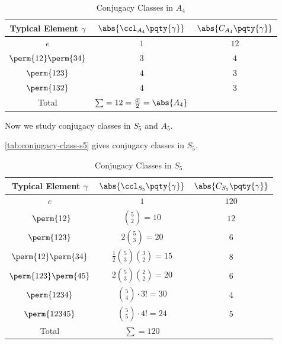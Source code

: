 \begin{table}[ht!]
    \centering
    \begin{tabular}{ccc}
        Typical Element \(\gamma\) & \(\abs{\ccl_{A_4} \pqty{\gamma}}\) & \(\abs{C_{A_4} \pqty{\gamma}}\)\\
        \hline\hline
        \(e\) & \(1\) & \(12\) \\
        \(\perm{12} \perm{34}\) & \(3\) & \(4\) \\
        \(\perm{123}\) & \(4\) & \(3\) \\
        \(\perm{132}\) & \(4\) & \(3\) \\
        \hline
        Total & \(\sum = 12 = \frac{4!}{2} = \abs{A_4}\)
    \end{tabular}
    \caption{Conjugacy Classes in \(A_4\)}
    \label{tab:conjugacy-class-a4}
\end{table}

Now we study conjugacy classes in \(S_5\) and \(A_5\).

\begin{example*}
    \autoref{tab:conjugacy-class-s5} gives conjugacy classes in \(S_5\).
\end{example*}

\begin{table}[ht!]
    \centering
    \begin{tabular}{ccc}
        Typical Element \(\gamma\) & \(\abs{\ccl_{S_5} \pqty{\gamma}}\) & \(\abs{C_{S_5} \pqty{\gamma}}\)\\
        \hline\hline
        \(e\) & \(1\) & \(120\) \\\
        \(\perm{12}\) & \(\binom{5}{2} = 10\) & \(12\) \\
        \(\perm{123}\) & \(2 \binom{5}{3} = 20\) & \(6\) \\
        \(\perm{12} \perm{34}\) & \(\frac{1}{2} \binom{5}{3} \binom{3}{2} = 15\) & \(8\) \\
        \(\perm{123} \perm{45}\) & \(2 \binom{5}{3} \binom{2}{2} = 20\) & \(6\) \\
        \(\perm{1234}\) & \(\binom{5}{4} \cdot 3! = 30\) & \(4\) \\
        \(\perm{12345}\) & \(\binom{5}{5} \cdot 4! = 24\) & \(5\) \\
        \hline
        Total & \(\sum = 120\) &
    \end{tabular}
    \caption{Conjugacy Classes in \(S_5\)}
    \label{tab:conjugacy-class-s5}
\end{table}

